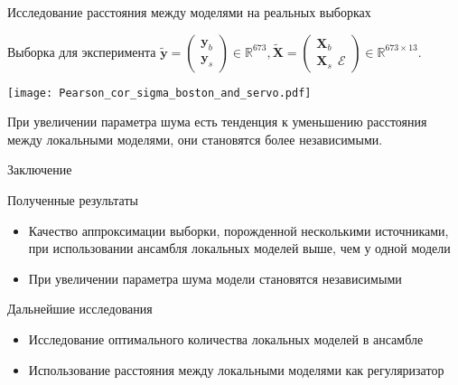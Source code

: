 \documentclass[9pt,pdf,hyperref={unicode}]{beamer}
\begin{document}
\begin{frame}{Исследование расстояния между моделями на реальных выборках}
    
    Выборка для эксперимента
$\tilde{\mathbf{y}} = \begin{pmatrix}
\mathbf{y}_b\\
\mathbf{y}_s
\end{pmatrix} \in \mathbb{R}^{673}, \tilde{\mathbf{X}} = \begin{pmatrix}
\mathbf{X}_b\\
\mathbf{X}_s ~~\mathbf{\mathcal{E}}
\end{pmatrix} \in \mathbb{R}^{673\times 13}.$

\begin{center}
\texttt{[image: Pearson\_cor\_sigma\_boston\_and\_servo.pdf]}
\end{center}
При увеличении параметра шума есть тенденция к уменьшению расстояния между локальными моделями, они становятся более независимыми. 
\end{frame}





\begin{frame}{Заключение}
    \begin{block}{Полученные результаты}
    \begin{itemize}
        \item Качество аппроксимации выборки, порожденной несколькими источниками, при использовании ансамбля локальных моделей выше, чем у одной модели
        \item При увеличении параметра шума модели становятся независимыми
    \end{itemize}
    \end{block}
    \begin{block}{Дальнейшие исследования}
    \begin{itemize}
        \item Исследование оптимального количества локальных моделей в ансамбле
        \item Использование расстояния между локальными моделями как регуляризатор 
    \end{itemize}
    \end{block}
\end{frame}
\end{document}
